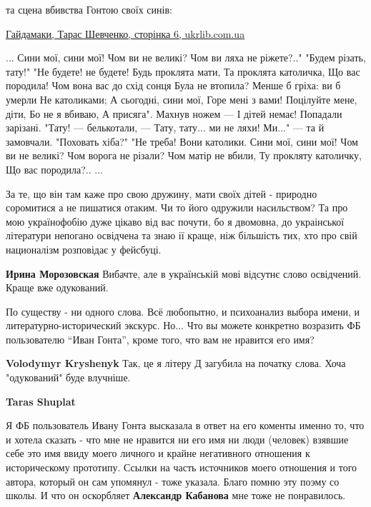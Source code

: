 \begin{itemize}
\begin{itemize}
\begin{multicols}{2}
\end{multicols}


та сцена вбивства Гонтою своїх синів:

\href{http://www.ukrlib.com.ua/books/printit.php?tid=723&page=6}{
Гайдамаки, Тарас Шевченко, сторінка 6, ukrlib.com.ua%
}

\begin{multicols}{2}
\obeycr
...
Сини мої, сини мої!
Чом ви не великі?
Чом ви ляха не ріжете?.."
"Будем різать, тату!"
"Не будете! не будете!
Будь проклята мати,
Та проклята католичка,
Що вас породила!
Чом вона вас до схід сонця
Була не втопила?
Менше б гріха: ви б умерли
Не католиками;
А сьогодні, сини мої,
Горе мені з вами!
Поцілуйте мене, діти,
Бо не я вбиваю,
А присяга". Махнув ножем —
І дітей немає!
Попадали зарізані.
"Тату! — белькотали, —
Тату, тату... ми не ляхи!
Ми..." — та й замовчали.
"Поховать хіба?"
"Не треба!
Вони католики.
Сини мої, сини мої!
Чом ви не великі?
Чом ворога не різали?
Чом матір не вбили,
Ту прокляту католичку,
Що вас породила?..
...
\restorecr
\end{multicols}


За те, що він там каже про свою дружину, мати своїх дітей - природно соромитися
а не пишатися отаким. Чи то його одружили насильством? Та про мою українофобію
дуже цікаво від вас почути, бо я двомовна, до украінської літератури непогано
освідчена та знаю ії краще, ніж більшість тих, хто про свій националізм
розповідає у фейсбуці.


\textbf{Ирина Морозовская} Вибачте, але в українській мові відсутнє слово освідчений. Краще вже одукований.


По существу - ни одного слова. Всё любопытно, и психоанализ выбора имени, и
литературно-исторический экскурс. Но... Что вы можете конкретно возразить ФБ
пользователю \enquote{Иван Гонта}, кроме того, что вам не нравится его имя?

\textbf{Volodymyr Kryshenyk} Так, це я літеру Д загубила на початку слова. Хоча "одукований" буде влучніше.

\textbf{Taras Shuplat} 

Я ФБ пользователь Ивану Гонта высказала в ответ на его коменты именно то, что и
хотела сказать - что мне не нравится ни его имя ни люди (человек) взявшие себе
это имя ввиду моего личного и крайне негативного отношения к историческому
прототипу. Ссылки на часть источников моего отношения и того автора, который он
сам упомянул - тоже указала. Благо помню эту поэму со школы. И что он
оскорбляет \textbf{Александр Кабанова} мне тоже не понравилось.


\end{itemize}
\end{itemize}
